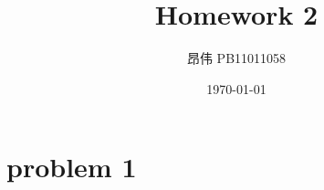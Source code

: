 \documentclass[4paper,10pt]{paper}
\title{Homework 2}
\author{昂伟 PB11011058}
\date{ \today }
\begin{document}
\maketitle

\section*{problem 1}
\end{document}
